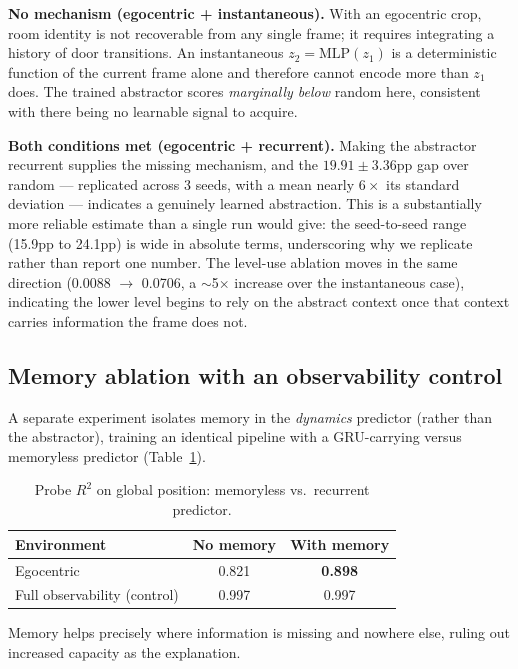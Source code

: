 \documentclass[11pt]{article}
\begin{document}
\textbf{No mechanism (egocentric + instantaneous).} With an egocentric crop, room identity is not recoverable from any single frame; it requires integrating a history of door transitions. An instantaneous $z_2 = \text{MLP}(z_1)$ is a deterministic function of the current frame alone and therefore cannot encode more than $z_1$ does. The trained abstractor scores \emph{marginally below} random here, consistent with there being no learnable signal to acquire.

\textbf{Both conditions met (egocentric + recurrent).} Making the abstractor recurrent supplies the missing mechanism, and the $19.91\pm3.36$pp gap over random --- replicated across 3 seeds, with a mean nearly $6\times$ its standard deviation --- indicates a genuinely learned abstraction. This is a substantially more reliable estimate than a single run would give: the seed-to-seed range (15.9pp to 24.1pp) is wide in absolute terms, underscoring why we replicate rather than report one number. The level-use ablation moves in the same direction (0.0088 $\to$ 0.0706, a $\sim$5$\times$ increase over the instantaneous case), indicating the lower level begins to rely on the abstract context once that context carries information the frame does not.

\subsection{Memory ablation with an observability control}

A separate experiment isolates memory in the \emph{dynamics} predictor (rather than the abstractor), training an identical pipeline with a GRU-carrying versus memoryless predictor (Table~\ref{tab:memory}).

\begin{table}[h]
\centering
\caption{Probe $R^2$ on global position: memoryless vs.\ recurrent predictor.}
\label{tab:memory}
\begin{tabular}{lcc}
\toprule
Environment & No memory & With memory \\
\midrule
Egocentric & 0.821 & \textbf{0.898} \\
Full observability (control) & 0.997 & 0.997 \\
\bottomrule
\end{tabular}
\end{table}

Memory helps precisely where information is missing and nowhere else, ruling out increased capacity as the explanation.
\end{document}
